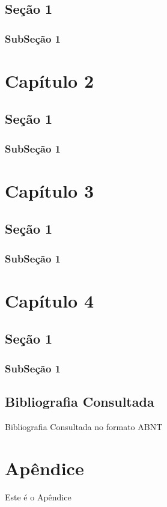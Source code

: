 \documentclass[12pt]{article}
\begin{document}
\subsection{\textbf{Seção 1}}
\subsubsection{\textbf{SubSeção 1}}
\newpage

\section{\textbf{Capítulo 2}}
\subsection{\textbf{Seção 1}}
\subsubsection{\textbf{SubSeção 1}}
\newpage


\section{\textbf{Capítulo 3}}
\subsection{\textbf{Seção 1}}
\subsubsection{\textbf{SubSeção 1}}
\newpage

\section{\textbf{Capítulo 4}}
\subsection{\textbf{Seção 1}}
\subsubsection{\textbf{SubSeção 1}}

\newpage
\begin{thebibliography}{9}
\section{\textbf{Bibliografia Consultada}}
Bibliografia Consultada no formato ABNT
\end{thebibliography}

\newpage
\appendix
\section{Apêndice}
Este é o Apêndice 
\end{document}
